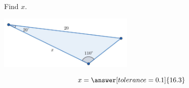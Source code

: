 \documentclass{ximera}
\begin{document}
\begin{problem}\label{prob:160hom12prob3}
Find $x$.
\begin{image}
   
\includegraphics[height=1in]{160H12pic2.jpg}~
 
\end{image}
$$x=\answer[tolerance=0.1]{16.3}$$
\end{problem}
\end{document}
